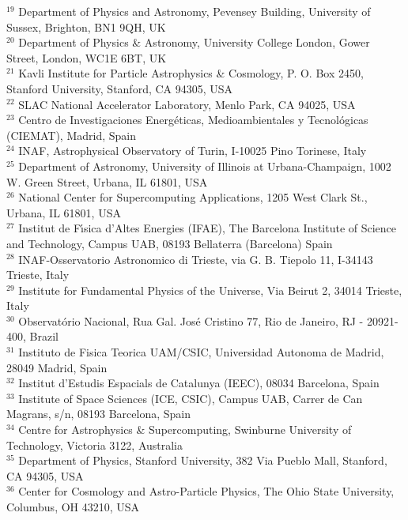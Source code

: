 {$^{19}$ Department of Physics and Astronomy, Pevensey Building, University of Sussex, Brighton, BN1 9QH, UK\\
$^{20}$ Department of Physics \& Astronomy, University College London, Gower Street, London, WC1E 6BT, UK\\
$^{21}$ Kavli Institute for Particle Astrophysics \& Cosmology, P. O. Box 2450, Stanford University, Stanford, CA 94305, USA\\
$^{22}$ SLAC National Accelerator Laboratory, Menlo Park, CA 94025, USA\\
$^{23}$ Centro de Investigaciones Energ\'eticas, Medioambientales y Tecnol\'ogicas (CIEMAT), Madrid, Spain\\
$^{24}$ INAF, Astrophysical Observatory of Turin, I-10025 Pino Torinese, Italy\\
$^{25}$ Department of Astronomy, University of Illinois at Urbana-Champaign, 1002 W. Green Street, Urbana, IL 61801, USA\\
$^{26}$ National Center for Supercomputing Applications, 1205 West Clark St., Urbana, IL 61801, USA\\
$^{27}$ Institut de F\'{\i}sica d'Altes Energies (IFAE), The Barcelona Institute of Science and Technology, Campus UAB, 08193 Bellaterra (Barcelona) Spain\\
$^{28}$ INAF-Osservatorio Astronomico di Trieste, via G. B. Tiepolo 11, I-34143 Trieste, Italy\\
$^{29}$ Institute for Fundamental Physics of the Universe, Via Beirut 2, 34014 Trieste, Italy\\
$^{30}$ Observat\'orio Nacional, Rua Gal. Jos\'e Cristino 77, Rio de Janeiro, RJ - 20921-400, Brazil\\
$^{31}$ Instituto de Fisica Teorica UAM/CSIC, Universidad Autonoma de Madrid, 28049 Madrid, Spain\\
$^{32}$ Institut d'Estudis Espacials de Catalunya (IEEC), 08034 Barcelona, Spain\\
$^{33}$ Institute of Space Sciences (ICE, CSIC),  Campus UAB, Carrer de Can Magrans, s/n,  08193 Barcelona, Spain\\
$^{34}$ Centre for Astrophysics \& Supercomputing, Swinburne University of Technology, Victoria 3122, Australia\\
$^{35}$ Department of Physics, Stanford University, 382 Via Pueblo Mall, Stanford, CA 94305, USA\\
$^{36}$ Center for Cosmology and Astro-Particle Physics, The Ohio State University, Columbus, OH 43210, USA\\
}

